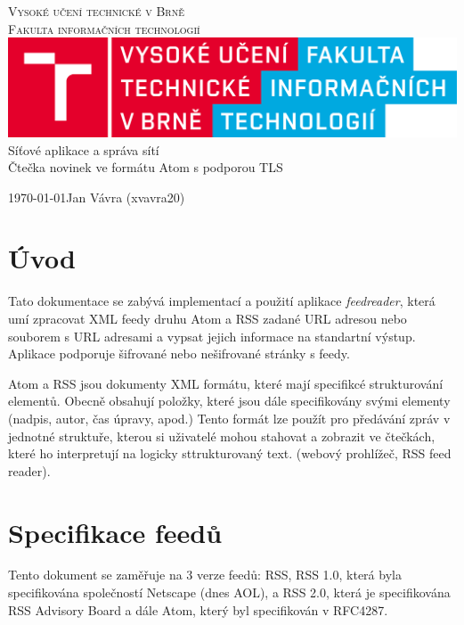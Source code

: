 \documentclass[11pt] {article}
\begin{document}
\begin{titlepage}
\begin{center}
\Huge
\textsc{Vysoké učení technické v Brně\\ \vspace{-2mm}
\huge Fakulta informačních technologií} \\
\includegraphics[scale=0.15]{logo.png}\\
\LARGE \hspace{-4mm} Síťové aplikace a správa sítí\\[-0.85mm]
\huge \hspace{0.25mm}  Čtečka novinek ve formátu Atom s podporou TLS
\end{center}
{\Large \today \hfill Jan Vávra (xvavra20)}
\end{titlepage}

\tableofcontents
\newpage

\section{Úvod}
\hspace{5mm}Tato dokumentace se zabývá implementací a použití aplikace \emph{feedreader}, která umí zpracovat XML feedy druhu Atom a RSS zadané URL adresou nebo souborem s URL adresami a vypsat jejich informace na standartní výstup. Aplikace podporuje šifrované nebo nešifrované stránky s feedy.
 
Atom a RSS jsou dokumenty XML formátu, které mají specifikcé strukturování elementů. \cite{Atom} Obecně obsahují položky, které jsou dále specifikovány svými elementy (nadpis, autor, čas úpravy, apod.)  Tento formát lze použít pro předávání zpráv v jednotné struktuře, kterou si uživatelé mohou stahovat a zobrazit ve čtečkách, které ho interpretují na logicky sttrukturovaný text. (webový prohlížeč, RSS feed reader). 

\section{Specifikace feedů}
\hspace{5mm}Tento dokument se zaměřuje na 3 verze feedů: RSS, RSS 1.0, která byla specifikována společností Netscape (dnes AOL), a RSS 2.0, která je specifikována RSS Advisory Board a dále Atom, který byl specifikován v RFC4287.
\end{document}
